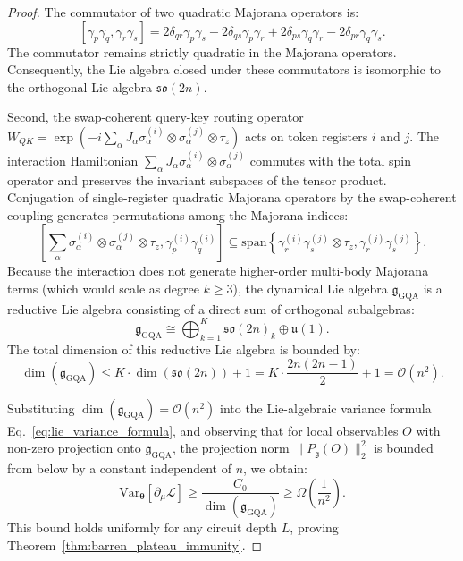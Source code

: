 \documentclass{article}
\begin{document}
\begin{proof}
The commutator of two quadratic Majorana operators is:
\begin{equation}
\left[ \gamma_p \gamma_q, \gamma_r \gamma_s \right] = 2 \delta_{qr} \gamma_p \gamma_s - 2 \delta_{qs} \gamma_p \gamma_r + 2 \delta_{ps} \gamma_q \gamma_r - 2 \delta_{pr} \gamma_q \gamma_s.
\label{eq:majorana_commutator}
\end{equation}
The commutator remains strictly quadratic in the Majorana operators. Consequently, the Lie algebra closed under these commutators is isomorphic to the orthogonal Lie algebra $\mathfrak{so}(2n)$.

Second, the swap-coherent query-key routing operator $W_{QK} = \exp\left(-i \sum_\alpha J_\alpha \sigma_\alpha^{(i)} \otimes \sigma_\alpha^{(j)} \otimes \tau_z\right)$ acts on token registers $i$ and $j$. The interaction Hamiltonian $\sum_\alpha J_\alpha \sigma_\alpha^{(i)} \otimes \sigma_\alpha^{(j)}$ commutes with the total spin operator and preserves the invariant subspaces of the tensor product. Conjugation of single-register quadratic Majorana operators by the swap-coherent coupling generates permutations among the Majorana indices:
\begin{equation}
\left[ \sum_\alpha \sigma_\alpha^{(i)} \otimes \sigma_\alpha^{(j)} \otimes \tau_z, \gamma_p^{(i)} \gamma_q^{(i)} \right] \subseteq \mathrm{span}\left\{ \gamma_r^{(i)} \gamma_s^{(j)} \otimes \tau_z, \gamma_r^{(j)} \gamma_s^{(j)} \right\}.
\label{eq:swap_commutation}
\end{equation}
Because the interaction does not generate higher-order multi-body Majorana terms (which would scale as degree $k \ge 3$), the dynamical Lie algebra $\mathfrak{g}_{\mathrm{GQA}}$ is a reductive Lie algebra consisting of a direct sum of orthogonal subalgebras:
\begin{equation}
\mathfrak{g}_{\mathrm{GQA}} \cong \bigoplus_{k=1}^K \mathfrak{so}(2n)_k \oplus \mathfrak{u}(1).
\label{eq:reductive_decomposition}
\end{equation}
The total dimension of this reductive Lie algebra is bounded by:
\begin{equation}
\dim(\mathfrak{g}_{\mathrm{GQA}}) \le K \cdot \dim(\mathfrak{so}(2n)) + 1 = K \cdot \frac{2n(2n-1)}{2} + 1 = \mathcal{O}(n^2).
\label{eq:dim_bound_proof}
\end{equation}

Substituting $\dim(\mathfrak{g}_{\mathrm{GQA}}) = \mathcal{O}(n^2)$ into the Lie-algebraic variance formula Eq.~\eqref{eq:lie_variance_formula}, and observing that for local observables $O$ with non-zero projection onto $\mathfrak{g}_{\mathrm{GQA}}$, the projection norm $\|P_{\mathfrak{g}}(O)\|_2^2$ is bounded from below by a constant independent of $n$, we obtain:
\begin{equation}
\mathrm{Var}_{\boldsymbol{\theta}}[\partial_\mu \mathcal{L}] \ge \frac{C_0}{\dim(\mathfrak{g}_{\mathrm{GQA}})} \ge \Omega\left(\frac{1}{n^2}\right).
\end{equation}
This bound holds uniformly for any circuit depth $L$, proving Theorem~\ref{thm:barren_plateau_immunity}.
\end{proof}
\end{document}
